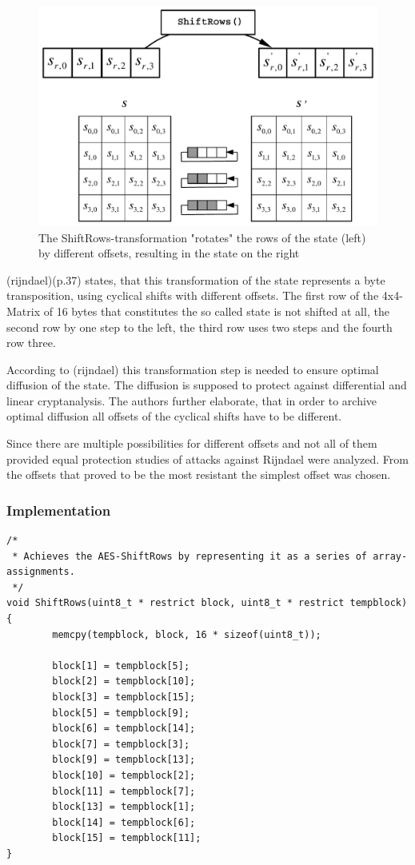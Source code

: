 \begin{figure}
\centering
\includegraphics[scale = 0.3]{data/figures/shiftrows.png} 
\caption{The ShiftRows-transformation "rotates" the rows of the state (left) by different offsets, resulting in the state on the right}
\end{figure}

(rijndael)(p.37) states, that this transformation of the state represents a byte transposition, using
cyclical shifts with different offsets. The first row of the 4x4-Matrix
of 16 bytes that constitutes the so called state is not shifted at all,
the second row by one step to the left, the third row uses two steps and
the fourth row three.

According to (rijndael) this transformation step is needed to ensure
optimal diffusion of the state. The diffusion is supposed to protect
against differential and linear cryptanalysis. The authors further
elaborate, that in order to archive optimal diffusion all
offsets of the cyclical shifts have to be different.

Since there are multiple possibilities for different offsets and not all
of them provided equal protection studies of attacks against Rijndael
were analyzed. From the offsets that proved to be the most resistant the
simplest offset was chosen.

\hypertarget{implementation-3}{%
\subsubsection{Implementation}\label{implementation-3}}

\begin{lstlisting}
/*
 * Achieves the AES-ShiftRows by representing it as a series of array-assignments.
 */
void ShiftRows(uint8_t * restrict block, uint8_t * restrict tempblock)
{
        memcpy(tempblock, block, 16 * sizeof(uint8_t));

        block[1] = tempblock[5];
        block[2] = tempblock[10];
        block[3] = tempblock[15];
        block[5] = tempblock[9];
        block[6] = tempblock[14];
        block[7] = tempblock[3];
        block[9] = tempblock[13];
        block[10] = tempblock[2];
        block[11] = tempblock[7];
        block[13] = tempblock[1];
        block[14] = tempblock[6];
        block[15] = tempblock[11];
}
\end{lstlisting}

